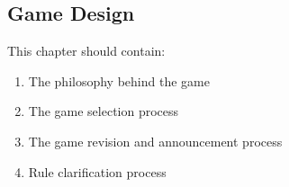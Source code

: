 \begin{draft}
\section{Game Design}

This chapter should contain:
\begin{enumerate}
\item The philosophy behind the game
\item The game selection process
\item The game revision and announcement process
\item Rule clarification process
\end{enumerate}
\end{draft}
